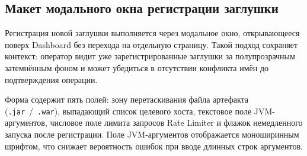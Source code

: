




\subsection{Макет модального окна регистрации заглушки}

Регистрация новой заглушки выполняется через модальное окно, открывающееся поверх Dashboard без перехода на отдельную страницу. Такой подход сохраняет контекст: оператор видит уже зарегистрированные заглушки за полупрозрачным затемнённым фоном и может убедиться в отсутствии конфликта имён до подтверждения операции.

Форма содержит пять полей: зону перетаскивания файла артефакта (\texttt{.jar}~/~\texttt{.war}), выпадающий список целевого хоста, текстовое поле JVM-аргументов, числовое поле лимита запросов Rate Limiter и флажок немедленного запуска после регистрации. Поле JVM-аргументов отображается моноширинным шрифтом, что снижает вероятность ошибок при вводе длинных строк аргументов.

